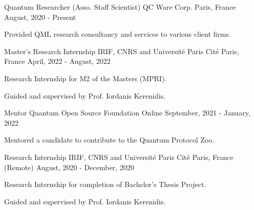 

\begin{cventries}

  \cventry
    {Quantum Researcher (Asso. Staff Scientist)} %
    {QC Ware Corp.} %
    {Paris, France} %
    {August, 2020 - Present} %
    {
      \begin{cvitems} %
        \item {Provided QML research consultancy and services to various client firms.}
      \end{cvitems}
    }

  \cventry
    {Master's Research Internship} %
    {IRIF, CNRS and  Université Paris Cité} %
    {Paris, France} %
    {April, 2022 - August, 2022} %
    {
      \begin{cvitems} %
        \item {Research Internship for M2 of the Masters (MPRI).}
        \item {Guided and supervised by Prof. Iordanis Kerenidis.}
      \end{cvitems}
    }

  \cventry
    {Mentor} %
    {Quantum Open Source Foundation} %
    {Online} %
    {September, 2021 - January, 2022} %
    {
      \begin{cvitems} %
        \item {Mentored a candidate to contribute to the Quantum Protocol Zoo.}
      \end{cvitems}
    }

  \cventry
    {Research Internship} %
    {IRIF, CNRS and  Université Paris Cité} %
    {Paris, France (Remote)} %
    {August, 2020 - December, 2020} %
    {
      \begin{cvitems} %
        \item {Research Internship for completion of Bachelor's Thesis Project.}
        \item {Guided and supervised by Prof. Iordanis Kerenidis.}
      \end{cvitems}
    }


\end{cventries}
